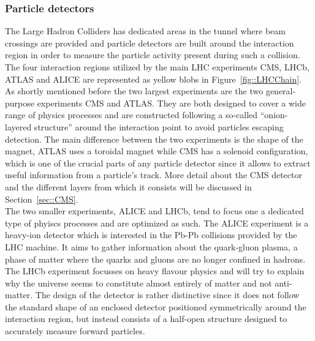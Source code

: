 
\subsubsection{Particle detectors}
The Large Hadron Colliders has dedicated areas in the tunnel where beam crossings are provided and particle detectors are built around the interaction region in order to measure the particle activity present during such a collision. The four interaction regions utilized by the main LHC experiments CMS, LHCb, ATLAS and ALICE are represented as yellow blobs in Figure~\ref{fig::LHCChain}. 
\\
As shortly mentioned before the two largest experiments are the two general-purpose experiments CMS and ATLAS. They are both designed to cover a wide range of physics processes and are constructed following a so-called ``onion-layered structure'' around the interaction point to avoid particles escaping detection. The main difference between the two experiments is the shape of the magnet, ATLAS uses a toroidal magnet while CMS has a solenoid configuration, which is one of the crucial parts of any particle detector since it allows to extract useful information from a particle's track. More detail about the CMS detector and the different layers from which it consists will be discussed in Section~\ref{sec::CMS}.
\\
The two smaller experiments, ALICE and LHCb, tend to focus one a dedicated type of phyiscs processes and are optimized as such. The ALICE experiment is a heavy-ion detector which is interested in the Pb-Pb collisions provided by the LHC machine. It aims to gather information about the quark-gluon plasma, a phase of matter where the quarks and gluons are no longer confined in hadrons. The LHCb experiment focusses on heavy flavour physics and will try to explain why the universe seems to constitute almost entirely of matter and not anti-matter. The design of the detector is rather distinctive since it does not follow the standard shape of an enclosed detector positioned symmetrically around the interaction region, but instead consists of a half-open structure designed to accurately measure forward particles.
